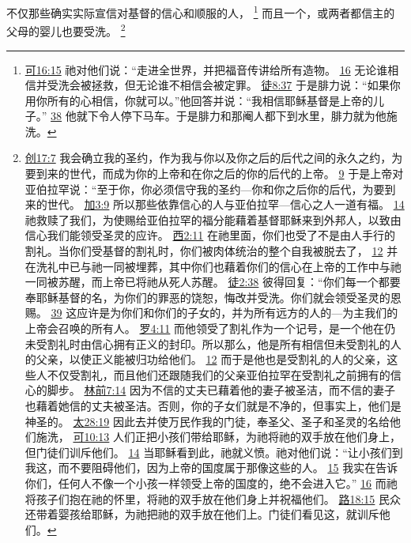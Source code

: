 \documentclass[12pt, a4paper, oneside]{ctexart}
\newcounter{parnum}[section]
\newcommand{\N}{%
   \noindent\refstepcounter{parnum}%
    \makebox[\parindent][l]{\textbf{\arabic{parnum}.}}}
\begin{document}
\N 不仅那些确实实际宣信对基督的信心和顺服的人，
	\footnote {
		\href{https://biblehub.com/mark/16-15.htm}{可16:15} 祂对他们说：“走进全世界，并把福音传讲给所有造物。
		\href{https://biblehub.com/mark/16-16.htm}{16} 无论谁相信并受洗会被拯救，但无论谁不相信会被定罪。
		\href{https://biblehub.com/acts/8-37.htm}{徒8:37} 于是腓力说：“如果你用你所有的心相信，你就可以。”他回答并说：“我相信耶稣基督是上帝的儿子。”
		\href{https://biblehub.com/acts/8-38.htm}{38} 他就下令人停下马车。于是腓力和那阉人都下到水里，腓力就为他施洗。
	}
	而且一个，或两者都信主的父母的婴儿也要受洗。
	\footnote {
		\href{https://biblehub.com/genesis/17-7.htm}{创17:7} 我会确立我的圣约，作为我与你以及你之后的后代之间的永久之约，为要到来的世代，而成为你的上帝和在你之后的你的后代的上帝。
		\href{https://biblehub.com/genesis/17-9.htm}{9} 于是上帝对亚伯拉罕说：“至于你，你必须信守我的圣约---你和你之后你的后代，为要到来的世代。
		\href{https://biblehub.com/galatians/3-9.htm}{加3:9} 所以那些依靠信心的人与亚伯拉罕---信心之人一道有福。
		\href{https://biblehub.com/galatians/3-14.htm}{14} 祂救赎了我们，为使赐给亚伯拉罕的福分能藉着基督耶稣来到外邦人，以致由信心我们能领受圣灵的应许。
		\href{https://biblehub.com/colossians/2-11.htm}{西2:11} 在祂里面，你们也受了不是由人手行的割礼。当你们受基督的割礼时，你们被肉体统治的整个自我被脱去了，
		\href{https://biblehub.com/colossians/2-12.htm}{12} 并在洗礼中已与祂一同被埋葬，其中你们也藉着你们的信心在上帝的工作中与祂一同被苏醒，而上帝已将祂从死人苏醒。
		\href{https://biblehub.com/acts/2-38.htm}{徒2:38} 彼得回复：“你们每一个都要奉耶稣基督的名，为你们的罪恶的饶恕，悔改并受洗。你们就会领受圣灵的恩赐。
		\href{https://biblehub.com/acts/2-39.htm}{39} 这应许是为你们和你们的子女的，并为所有远方的人的---为主我们的上帝会召唤的所有人。
		\href{https://biblehub.com/romans/4-11.htm}{罗4:11} 而他领受了割礼作为一个记号，是一个他在仍未受割礼时由信心拥有正义的封印。所以那么，他是所有相信但未受割礼的人的父亲，以使正义能被归功给他们。
		\href{https://biblehub.com/romans/4-12.htm}{12} 而于是他也是受割礼的人的父亲，这些人不仅受割礼，而且他们还跟随我们的父亲亚伯拉罕在受割礼之前拥有的信心的脚步。
		\href{https://biblehub.com/1_corinthians/7-14.htm}{林前7:14} 因为不信的丈夫已藉着他的妻子被圣洁，而不信的妻子也藉着她信的丈夫被圣洁。否则，你的子女们就是不净的，但事实上，他们是神圣的。
		\href{https://biblehub.com/matthew/28-19.htm}{太28:19} 因此去并使万民作我的门徒，奉圣父、圣子和圣灵的名给他们施洗，
		\href{https://biblehub.com/mark/10-13.htm}{可10:13} 人们正把小孩们带给耶稣，为祂将祂的双手放在他们身上，但门徒们训斥他们。
		\href{https://biblehub.com/mark/10-14.htm}{14} 当耶稣看到此，祂就义愤。祂对他们说：“让小孩们到我这，而不要阻碍他们，因为上帝的国度属于那像这些的人。
		\href{https://biblehub.com/mark/10-15.htm}{15} 我实在告诉你们，任何人不像一个小孩一样领受上帝的国度的，绝不会进入它。”
		\href{https://biblehub.com/mark/10-16.htm}{16} 而祂将孩子们抱在祂的怀里，将祂的双手放在他们身上并祝福他们。
		\href{https://biblehub.com/luke/18-15.htm}{路18:15} 民众还带着婴孩给耶稣，为祂把祂的双手放在他们上。门徒们看见这，就训斥他们。
	}
\end{document}
